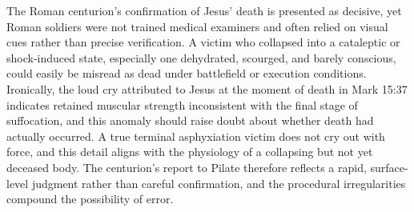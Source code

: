 The Roman centurion's confirmation of Jesus' death is presented as decisive, yet Roman soldiers were not trained medical examiners and often relied on visual cues rather than precise verification.
A victim who collapsed into a cataleptic or shock-induced state, especially one dehydrated, scourged, and barely conscious, could easily be misread as dead under battlefield or execution conditions.
Ironically, the loud cry attributed to Jesus at the moment of death in Mark 15:37 indicates retained muscular strength inconsistent with the final stage of suffocation, and this anomaly should raise doubt about whether death had actually occurred.
A true terminal asphyxiation victim does not cry out with force, and this detail aligns with the physiology of a collapsing but not yet deceased body.
The centurion's report to Pilate therefore reflects a rapid, surface-level judgment rather than careful confirmation, and the procedural irregularities compound the possibility of error.

